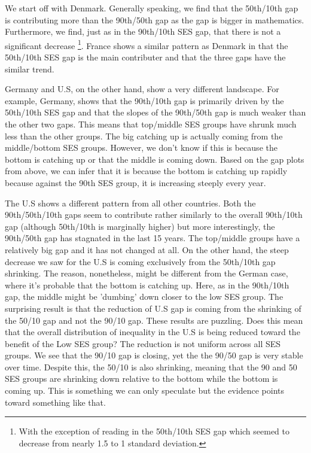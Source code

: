 \documentclass[11pt, a4paper]{article}\usepackage[]{graphicx}\usepackage[]{color}
\begin{document}

We start off with Denmark. Generally speaking, we find that the 50th/10th gap is contributing more than the 90th/50th gap as the gap is bigger in mathematics. Furthermore, we find, just as in the 90th/10th SES gap, that there is not a significant decrease \footnote{With the exception of reading in the 50th/10th SES gap which seemed to decrease from nearly 1.5 to 1 standard deviation.}. France shows a similar pattern as Denmark in that the 50th/10th SES gap is the main contributer and that the three gaps have the similar trend. 

Germany and U.S, on the other hand, show a very different landscape. For example, Germany, shows that the 90th/10th gap is primarily driven by the 50th/10th SES gap and that the slopes of the 90th/50th gap is much weaker than the other two gaps. This means that top/middle SES groups have shrunk much less than the other groups. The big catching up is actually coming from the middle/bottom SES groups. However, we don't know if this is because the bottom is catching up or that the middle is coming down. Based on the gap plots from above, we can infer that it is because the bottom is catching up rapidly because against the 90th SES group, it is increasing steeply every year.

The U.S shows a different pattern from all other countries. Both the 90th/50th/10th gaps seem to contribute rather similarly to the overall 90th/10th gap (although 50th/10th is marginally higher) but more interestingly, the 90th/50th gap has stagnated in the last 15 years. The top/middle groups have a relatively big gap and it has not changed at all. On the other hand, the steep decrease we saw for the U.S is coming exclusively from the 50th/10th gap shrinking. The reason, nonetheless, might be different from the German case, where it's probable that the bottom is catching up. Here, as in the 90th/10th gap, the middle might be 'dumbing' down closer to the low SES group. The surprising result is that the reduction of U.S gap is coming from the shrinking of the 50/10 gap and not the 90/10 gap. These results are puzzling. Does this mean that the overall distribution of inequality in the U.S is being reduced toward the benefit of the Low SES group? The reduction is not uniform across all SES groups. We see that the 90/10 gap is closing, yet the the 90/50 gap is very stable over time. Despite this, the 50/10 is also shrinking, meaning that the 90 and 50 SES groups are shrinking down relative to the bottom while the bottom is coming up. This is something we can only speculate but the evidence points toward something like that.
\end{document}
